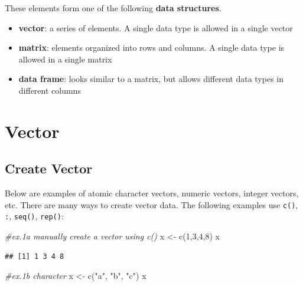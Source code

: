 \documentclass[
]{book}
\newenvironment{Shaded}{\begin{snugshade}}{\end{snugshade}}
\newcommand{\CommentTok}[1]{\textcolor[rgb]{0.56,0.35,0.01}{\textit{#1}}}
\newcommand{\DecValTok}[1]{\textcolor[rgb]{0.00,0.00,0.81}{#1}}
\newcommand{\FunctionTok}[1]{\textcolor[rgb]{0.00,0.00,0.00}{#1}}
\newcommand{\NormalTok}[1]{#1}
\newcommand{\OtherTok}[1]{\textcolor[rgb]{0.56,0.35,0.01}{#1}}
\newcommand{\StringTok}[1]{\textcolor[rgb]{0.31,0.60,0.02}{#1}}
\providecommand{\tightlist}{%
  \setlength{\itemsep}{0pt}\setlength{\parskip}{0pt}}
\begin{document}
These elements form one of the following \textbf{data structures}.

\begin{itemize}
\tightlist
\item
  \textbf{vector}: a series of elements. A single data type is allowed in a single vector
\item
  \textbf{matrix}: elements organized into rows and columns. A single data type is allowed in a single matrix
\item
  \textbf{data frame}: looks similar to a matrix, but allows different data types in different columns
\end{itemize}

\hypertarget{vector}{%
\section{Vector}\label{vector}}

\hypertarget{create-vector}{%
\subsection{Create Vector}\label{create-vector}}

Below are examples of atomic character vectors, numeric vectors, integer vectors, etc. There are many ways to create vector data. The following examples use \texttt{c()}, \texttt{:}, \texttt{seq()}, \texttt{rep()}:

\begin{Shaded}
\begin{Highlighting}[]
\CommentTok{\#ex.1a manually create a vector using c()}
\NormalTok{x }\OtherTok{\textless{}{-}} \FunctionTok{c}\NormalTok{(}\DecValTok{1}\NormalTok{,}\DecValTok{3}\NormalTok{,}\DecValTok{4}\NormalTok{,}\DecValTok{8}\NormalTok{)}
\NormalTok{x}
\end{Highlighting}
\end{Shaded}

\begin{verbatim}
## [1] 1 3 4 8
\end{verbatim}

\begin{Shaded}
\begin{Highlighting}[]
\CommentTok{\#ex.1b character}
\NormalTok{x }\OtherTok{\textless{}{-}} \FunctionTok{c}\NormalTok{(}\StringTok{"a"}\NormalTok{, }\StringTok{"b"}\NormalTok{, }\StringTok{"c"}\NormalTok{)}
\NormalTok{x}
\end{Highlighting}
\end{Shaded}
\end{document}
